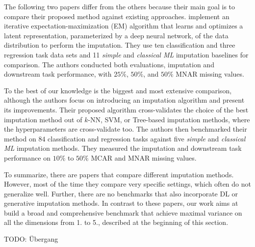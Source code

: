 The following two papers differ from the others because their main goal is to compare their proposed method against existing approaches. \cite{Imputation_Benchmark_6} implement an iterative expectation-maximization (EM) algorithm that learns and optimizes a latent representation, parameterized by a deep neural network, of the data distribution to perform the imputation. They use ten classification and three regression task data sets and 11 \emph{simple} and \emph{classical ML} imputation baselines for comparison. The authors conducted both evaluations, imputation and downstream task performance, with $25\%$, $50\%$, and $50\%$ MNAR missing values.

To the best of our knowledge \citep{Imputation_Benchmark_4} is the biggest and most extensive comparison, although the authors focus on introducing an imputation algorithm and present its improvements. Their proposed algorithm cross-validates the choice of the best imputation method out of $k$-NN, SVM, or Tree-based imputation methods, where the hyperparameters are cross-validate too. The authors then benchmarked their method on $84$ classification and regression tasks against five \emph{simple} and \emph{classical ML} imputation methods. They measured the imputation and downstream task performance on $10\%$ to $50\%$ MCAR and MNAR missing values.

To summarize, there are papers that compare different imputation methods. However, most of the time they compare very specific settings, which often do not generalize well. Further, there are no benchmarks that also incorporate DL or generative imputation methods. In contrast to these papers, our work aims at build a broad and comprehensive benchmark that achieve maximal variance on all the dimensions from 1. to 5., described at the beginning of this section.


TODO: Übergang
